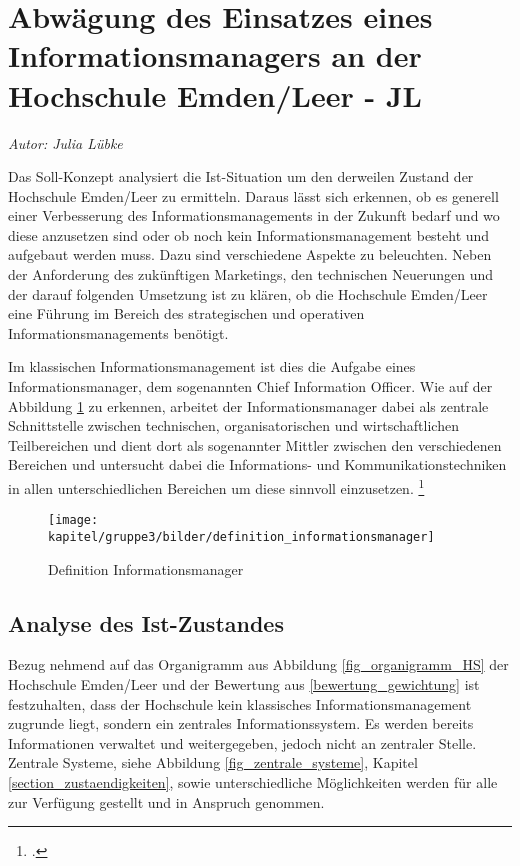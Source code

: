 \section{Abwägung des Einsatzes eines Informationsmanagers an der Hochschule Emden/Leer - JL}

\textit{Autor: Julia Lübke}

Das Soll-Konzept analysiert die Ist-Situation um den derweilen Zustand der  Hochschule Emden/Leer zu ermitteln. Daraus lässt sich erkennen, ob es generell einer Verbesserung des Informationsmanagements in der Zukunft bedarf und wo diese anzusetzen sind oder ob noch kein Informationsmanagement besteht und aufgebaut werden muss. Dazu sind verschiedene Aspekte zu beleuchten. Neben der Anforderung des zukünftigen Marketings, den technischen Neuerungen und der darauf folgenden Umsetzung ist zu klären, ob die Hochschule Emden/Leer eine Führung im Bereich des strategischen und operativen Informationsmanagements benötigt.

Im klassischen Informationsmanagement ist dies die Aufgabe eines Informationsmanager, dem sogenannten Chief Information Officer. Wie auf der Abbildung \ref{fig_def_inm} zu erkennen, arbeitet der Informationsmanager dabei als zentrale Schnittstelle zwischen technischen, organisatorischen und wirtschaftlichen Teilbereichen und dient dort als sogenannter Mittler zwischen den verschiedenen Bereichen und untersucht dabei die Informations- und Kommunikationstechniken in allen unterschiedlichen Bereichen um diese sinnvoll einzusetzen. 
\footcite[86]{definition_informationsmanager}

\begin{figure}[h!]
	\centering
	\texttt{[image: kapitel/gruppe3/bilder/definition\_informationsmanager]}
	\caption{Definition Informationsmanager}
	\label{fig_def_inm}
\end{figure}

\subsection{Analyse des Ist-Zustandes}
\label{subsection_analyse_ist_zustand}

Bezug nehmend auf das Organigramm aus Abbildung \ref{fig_organigramm_HS} der Hochschule Emden/Leer und der Bewertung aus  \ref{bewertung_gewichtung} ist festzuhalten, dass der Hochschule kein klassisches Informationsmanagement zugrunde liegt, sondern ein zentrales Informationssystem. Es werden bereits Informationen verwaltet und weitergegeben, jedoch nicht an zentraler Stelle. Zentrale Systeme, siehe Abbildung \ref{fig_zentrale_systeme}, Kapitel \ref{section_zustaendigkeiten}, sowie unterschiedliche Möglichkeiten werden für alle zur Verfügung gestellt und in Anspruch genommen. 

